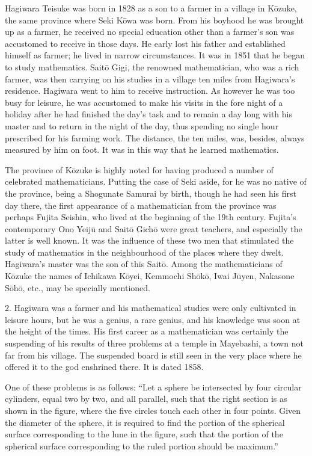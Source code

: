 \documentclass[11pt]{article}
\newcommand{\scanpage}[2]{\clearpage\setcounter{footnote}{0}\noindent{\footnotesize\color{gray}PDF page #1 · #2}\par\medskip}
\begin{document}
Hagiwara Teisuke was born in 1828 as a son to a farmer in a village in Kōzuke, the same province where Seki Kōwa was born. From his boyhood he was brought up as a farmer, he received no special education other than a farmer's son was accustomed to receive in those days. He early lost his father and established himself as farmer; he lived in narrow circumstances. It was in 1851 that he began to study mathematics. Saitō Gigi, the renowned mathematician, who was a rich farmer, was then carrying on his studies in a village ten miles from Hagiwara's residence. Hagiwara went to him to receive instruction. As however he was too busy for leisure, he was accustomed to make his visits in the fore night of a holiday after he had finished the day's task and to remain a day long with his master and to return in the night of the day, thus spending no single hour prescribed for his farming work. The distance, the ten miles, was, besides, always measured by him on foot. It was in this way that he learned mathematics.

The province of Kōzuke is highly noted for having produced a number of celebrated mathematicians. Putting the case of Seki aside, for he was no native of the province, being a Shogunate Samurai by birth, though he had seen his first day there, the first appearance of a mathematician from the province was perhaps Fujita Seishin, who lived at the beginning of the 19th century. Fujita's contemporary Ono Yeijū and Saitō Gichō were great teachers, and especially the latter is well known. It was the influence of these two men that stimulated the study of mathematics in the neighbourhood of the places where they dwelt. Hagiwara's master was the son of this Saitō. Among the mathematicians of Kōzuke the names of Ichikawa Kōyei, Kemmochi Shōkō, Iwai Jūyen, Nakasone Sōhō, etc., may be specially mentioned.

2. Hagiwara was a farmer and his mathematical studies were only cultivated in leisure hours, but he was a genius, a rare genius, and his knowledge was soon at the height of the times. His first career as a mathematician was certainly the suspending of his results of three problems at a temple in Mayebashi, a town not far from his village. The suspended board is still seen in the very place where he offered it to the god enshrined there. It is dated 1858.

\scanpage{0317}{printed page 303}
One of these problems is as follows: ``Let a sphere be intersected by four circular cylinders, equal two by two, and all parallel, such that the right section is as shown in the figure, where the five circles touch each other in four points. Given the diameter of the sphere, it is required to find the portion of the spherical surface corresponding to the lune in the figure, such that the portion of the spherical surface corresponding to the ruled portion should be maximum.''
\end{document}
